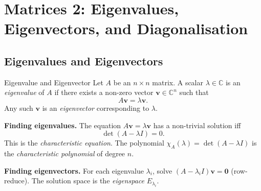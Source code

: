 \documentclass[12pt, a4paper]{book}
\newcommand{\C}{\mathbb{C}}
\renewcommand{\vec}[1]{\mathbf{#1}}
\begin{document}
\chapter{Matrices 2: Eigenvalues, Eigenvectors, and Diagonalisation}

\section{Eigenvalues and Eigenvectors}

\begin{definition}{Eigenvalue and Eigenvector}{}
Let $A$ be an $n\times n$ matrix. A scalar $\lambda\in\C$ is an \emph{eigenvalue} of $A$ if there exists a non-zero vector $\vec{v}\in\C^n$ such that
\[
A\vec{v} = \lambda\vec{v}.
\]
Any such $\vec{v}$ is an \emph{eigenvector} corresponding to $\lambda$.
\end{definition}

\textbf{Finding eigenvalues.} The equation $A\vec{v}=\lambda\vec{v}$ has a non-trivial solution iff
\[
\det(A - \lambda I) = 0.
\]
This is the \emph{characteristic equation}. The polynomial $\chi_A(\lambda)=\det(A-\lambda I)$ is the \emph{characteristic polynomial} of degree $n$.

\textbf{Finding eigenvectors.} For each eigenvalue $\lambda_i$, solve $(A-\lambda_i I)\vec{v}=\vec{0}$ (row-reduce). The solution space is the \emph{eigenspace} $E_{\lambda_i}$.
\end{document}
